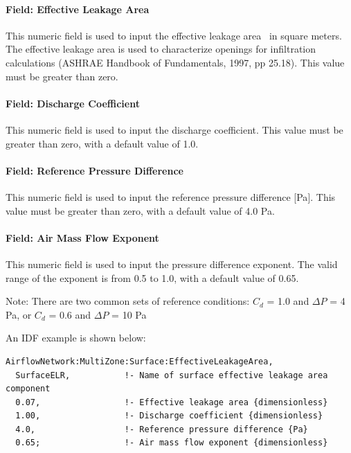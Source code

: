 \paragraph{Field: Effective Leakage Area}\label{field-effective-leakage-area}

This numeric field is used to input the effective leakage area~ in square meters. The effective leakage area is used to characterize openings for infiltration calculations (ASHRAE Handbook of Fundamentals, 1997, pp 25.18). This value must be greater than zero.

\paragraph{Field: Discharge Coefficient}\label{field-discharge-coefficient}

This numeric field is used to input the discharge coefficient. This value must be greater than zero, with a default value of 1.0.

\paragraph{Field: Reference Pressure Difference}\label{field-reference-pressure-difference}

This numeric field is used to input the reference pressure difference {[}Pa{]}. This value must be greater than zero, with a default value of 4.0 Pa.

\paragraph{Field: Air Mass Flow Exponent}\label{field-air-mass-flow-exponent-1}

This numeric field is used to input the pressure difference exponent. The valid range of the exponent is from 0.5 to 1.0, with a default value of 0.65.

\begin{callout}
  Note: There are two common sets of reference conditions: \(C_{d}\) = 1.0 and \(\Delta P\) = 4 Pa, or \(C_d\) = 0.6 and \(\Delta P\) = 10 Pa
\end{callout}

An IDF example is shown below:

\begin{lstlisting}
AirflowNetwork:MultiZone:Surface:EffectiveLeakageArea,
  SurfaceELR,           !- Name of surface effective leakage area component
  0.07,                 !- Effective leakage area {dimensionless}
  1.00,                 !- Discharge coefficient {dimensionless}
  4.0,                  !- Reference pressure difference {Pa}
  0.65;                 !- Air mass flow exponent {dimensionless}
\end{lstlisting}

